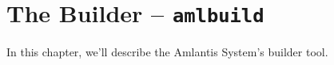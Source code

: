 
\chapter[The Builder -- amlbuild]{The Builder -- \lstinline!amlbuild!}
\label{ch:tools-amlbuild}

In this chapter, we'll describe the Amlantis System's builder tool. 






